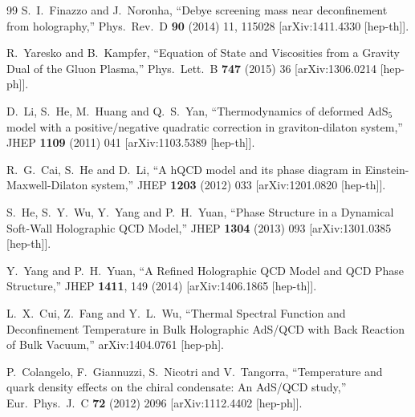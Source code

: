 \documentclass[11pt,a4paper,psfrag]{article}
\begin{document}
\begin{thebibliography}{99}
  S.~I.~Finazzo and J.~Noronha,
  ``Debye screening mass near deconfinement from holography,''
  Phys.\ Rev.\ D {\bf 90} (2014) 11,  115028
  [arXiv:1411.4330 [hep-th]].

  R.~Yaresko and B.~Kampfer,
  ``Equation of State and Viscosities from a Gravity Dual of the Gluon Plasma,''
  Phys.\ Lett.\ B {\bf 747} (2015) 36
  [arXiv:1306.0214 [hep-ph]].

  D.~Li, S.~He, M.~Huang and Q.~S.~Yan,
  ``Thermodynamics of deformed AdS$_5$ model with a positive/negative quadratic correction in graviton-dilaton system,''
  JHEP {\bf 1109} (2011) 041
  [arXiv:1103.5389 [hep-th]].

  R.~G.~Cai, S.~He and D.~Li,
  ``A hQCD model and its phase diagram in Einstein-Maxwell-Dilaton system,''
  JHEP {\bf 1203} (2012) 033
  [arXiv:1201.0820 [hep-th]].

  S.~He, S.~Y.~Wu, Y.~Yang and P.~H.~Yuan,
  ``Phase Structure in a Dynamical Soft-Wall Holographic QCD Model,''
  JHEP {\bf 1304} (2013) 093
  [arXiv:1301.0385 [hep-th]].

  Y.~Yang and P.~H.~Yuan,
  ``A Refined Holographic QCD Model and QCD Phase Structure,''
  JHEP {\bf 1411}, 149 (2014)
  [arXiv:1406.1865 [hep-th]].

  L.~X.~Cui, Z.~Fang and Y.~L.~Wu,
  ``Thermal Spectral Function and Deconfinement Temperature in Bulk Holographic AdS/QCD with Back Reaction of Bulk Vacuum,''
  arXiv:1404.0761 [hep-ph].


  P.~Colangelo, F.~Giannuzzi, S.~Nicotri and V.~Tangorra,
  ``Temperature and quark density effects on the chiral condensate: An AdS/QCD study,''
  Eur.\ Phys.\ J.\ C {\bf 72} (2012) 2096  [arXiv:1112.4402 [hep-ph]].


\end{thebibliography}
\end{document}

